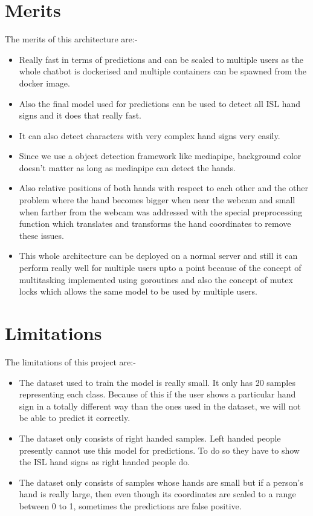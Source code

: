 \documentclass[12pt,a4paper]{report}
\begin{document}
\section{Merits}
The merits of this architecture are:-
\begin{itemize}
	\item Really fast in terms of predictions and can be scaled to multiple users as the whole chatbot is dockerised and multiple containers can be spawned from the docker image.
	\item Also the final model used for predictions can be used to detect all ISL hand signs and it does that really fast.
	\item It can also detect characters with very complex hand signs very easily.
	\item Since we use a object detection framework like mediapipe, background color doesn't matter as long as mediapipe can detect the hands.
	\item Also relative positions of both hands with respect to each other and the other problem where the hand becomes bigger when near the webcam and small when farther from the webcam was addressed with the special preprocessing function which translates and transforms the hand coordinates to remove these issues.
	\item This whole architecture can be deployed on a normal server and still it can perform really well for multiple users upto a point because of the concept of multitasking implemented using goroutines and also the concept of mutex locks which allows the same model to be used by multiple users.
\end{itemize}

\section{Limitations}
The limitations of this project are:-
\begin{itemize}
	\item The dataset used to train the model is really small. It only has 20 samples representing each class. Because of this if the user shows a particular hand sign in a totally different way than the ones used in the dataset, we will not be able to predict it correctly.
	\item The dataset only consists of right handed samples. Left handed people presently cannot use this model for predictions. To do so they have to show the ISL hand signs as right handed people do.
	\item The dataset only consists of samples whose hands are small but if a person's hand is really large, then even though its coordinates are scaled to a range between 0 to 1, sometimes the predictions are false positive.
\end{itemize}
\end{document}

